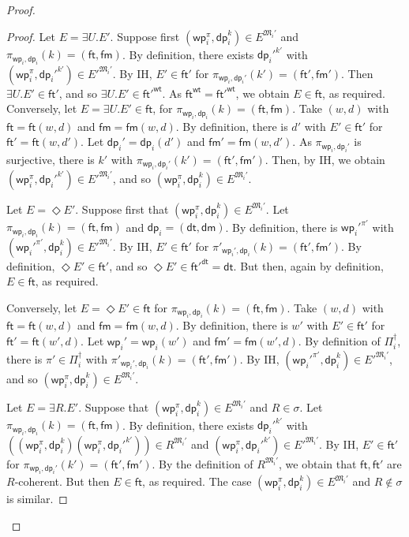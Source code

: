\documentclass{lmcs} %
\theoremstyle{plain}\newtheorem{satz}[thm]{Satz} %
\newcommand{\wt}{\mathsf{wt}}
\newcommand{\dt}{\mathsf{dt}}
\newcommand{\ft}{\mathsf{ft}}
\newcommand{\dm}{\mathsf{dm}}
\newcommand{\iwp}{\mathsf{wp}_i}
\newcommand{\idp}{\mathsf{dp}_i}
\newcommand{\pet}{\ft}
\newcommand{\pam}{\mathsf{fm}}
\begin{document}
\begin{proof}
\begin{proof}
Let $E = \exists U.E'$. Suppose first $(\iwp^{\pi},\idp^{k}) \in E^{\mathfrak{M}_{i}'}$ and $\pi_{\iwp,\idp}(k)= (\pet, \pam)$.
By definition, there exists ${\idp'}^{k'}$ with  
$(\iwp^{\pi},{\idp'}^{k'}) \in E'^{\mathfrak{M}_{i}'}$. By IH,
$E'\in \pet'$ for $\pi_{\iwp,\idp'}(k')=
(\pet',\pam')$. Then $\exists U.E'\in \pet'$, and so $\exists U.E'\in {\pet'}^{\wt}$. As $\pet^{\wt}={\pet'}^{\wt}$, we obtain $E\in \pet$, as required.
%
Conversely, let $E = \exists U.E' \in \pet$, for $\pi_{\iwp,\idp}(k)=
(\pet, \pam)$. Take $(w,d)$ with $\pet=\pet(w,d)$ and $\pam=\pam(w,d)$. By definition, there is $d'$ with $E'\in \pet'$ for
$\pet'=\pet(w,d')$. Let $\idp'=\idp(d')$ and $\pam'=\pam(w,d')$. As $\pi_{\iwp,\idp'}$ is surjective, there is
$k'$ with $\pi_{\iwp,\idp'}(k')=(\pet',\pam')$.
Then, by IH, we obtain $(\iwp^\pi, \idp'^{k'}) \in E'^{\mathfrak{M}_{i}'}$, and so $(\iwp^\pi, \idp^k) \in E^{\mathfrak{M}_{i}'}$.

Let $E = \Diamond E'$. Suppose first that $(\iwp^\pi, \idp^k) \in E^{\mathfrak{M}_{i}'}$. Let $\pi_{\iwp,\idp}(k)= (\pet, \pam)$ and $\idp = (\dt,\dm)$. By definition, there is $\iwp'^{\pi'}$ with
$(\iwp'^{\pi'},\idp^k) \in E'^{\mathfrak{M}_{i}'}$. By IH,
$E'\in \pet'$ for $\pi'_{\iwp',\idp}(k)=
(\pet',\pam')$. By definition, $\Diamond E'\in \pet'$, and so
$\Diamond E'\in {\pet'}^{\dt}=\dt$. But then, again by definition, $E\in \pet$,
as required.

Conversely, let $E = \Diamond E' \in \pet$ for $\pi_{\iwp,\idp}(k)=
(\pet,\pam)$. Take $(w,d)$ with $\pet=\pet(w,d)$ and $\pam=\pam(w,d)$. By definition, there is $w'$ with $E'\in \pet'$ for
$\pet'=\pet(w',d)$. Let $\iwp'=\iwp(w')$ and $\pam'=\pam(w',d)$. By definition of $\Pi_{i}^{\dag}$, there is $\pi'\in \Pi_{i}^{\dag}$ with $\pi'_{\iwp',\idp}(k) =(\pet',\pam')$. By IH, $(\iwp'^{\pi'},\idp^k) \in E'^{\mathfrak{M}_{i}'}$, and so $(\iwp^\pi,\idp^k) \in E^{\mathfrak{M}_{i}'}$.

Let $E = \exists R.E'$. Suppose that $(\iwp^\pi,\idp^k) \in E^{\mathfrak{M}_{i}'}$ and $R\in \sigma$. Let $\pi_{\iwp,\idp}(k)= (\pet, \pam)$. By definition, there exists $\idp'^{k'}$ with
%
$((\iwp^\pi,\idp^k)(\iwp^\pi,\idp'^{k'})) \in R^{\mathfrak{M}_{i}'}$
%
and $(\iwp^\pi,\idp'^{k'}) \in E'^{\mathfrak{M}_{i}'}$. By IH,
$E'\in \pet'$ for $\pi_{\iwp,\idp'}(k')=
(\pet',\pam')$. By the definition of $R^{\mathfrak{M}_{i}'}$, we obtain that $\pet,\pet'$ are $R$-coherent. But then $E\in \pet$, as required.
%
The case $(\iwp^\pi,\idp^k) \in E^{\mathfrak{M}_{i}'}$ and $R\not\in \sigma$ is similar.


\end{proof}
\end{proof}
\end{document}
